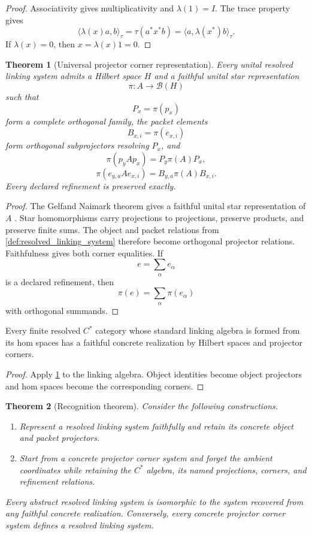 \documentclass{aomart}
\newtheorem{theorem}{Theorem}[section]
\theoremstyle{definition}
\theoremstyle{remark}
\newcommand{\B}{\mathcal B}
\newcommand{\Rcite}[1]{\cite{#1}}
\begin{document}
\begin{proof}
Associativity gives multiplicativity and \(\lambda(1)=I\). The trace property gives
\[
 \langle\lambda(x)a,b\rangle_\tau
 =
 \tau(a^*x^*b)
 =
 \langle a,\lambda(x^*)b\rangle_\tau.
\]
If \(\lambda(x)=0\), then \(x=\lambda(x)1=0\).
\end{proof}

\begin{theorem}[Universal projector corner representation]\label{thm:universal_projector_representation}
Every unital resolved linking system admits a Hilbert space \(H\) and a faithful unital star representation
\[
 \pi:A\longrightarrow\B(H)
\]
such that
\[
 P_x=\pi(p_x)
\]
form a complete orthogonal family, the packet elements
\[
 B_{x,i}=\pi(e_{x,i})
\]
form orthogonal subprojectors resolving \(P_x\), and
\[
 \pi(p_yAp_x)=P_y\pi(A)P_x,
\]
\[
 \pi(e_{y,a}Ae_{x,i})
 =
 B_{y,a}\pi(A)B_{x,i}.
\]
Every declared refinement is preserved exactly.
\end{theorem}

\begin{proof}
The Gelfand Naimark theorem gives a faithful unital star representation of \(A\) \Rcite{R1}. Star homomorphisms carry projections to projections, preserve products, and preserve finite sums. The object and packet relations from \cref{def:resolved_linking_system} therefore become orthogonal projector relations. Faithfulness gives both corner equalities. If
\[
 e=\sum_\alpha e_\alpha
\]
is a declared refinement, then
\[
 \pi(e)=\sum_\alpha\pi(e_\alpha)
\]
with orthogonal summands.
\end{proof}

\begin{corollary}\label{cor:resolved_categories}
Every finite resolved \(C^*\) category whose standard linking algebra is formed from its hom spaces has a faithful concrete realization by Hilbert spaces and projector corners.
\end{corollary}

\begin{proof}
Apply \cref{thm:universal_projector_representation} to the linking algebra. Object identities become object projectors and hom spaces become the corresponding corners.
\end{proof}

\begin{theorem}[Recognition theorem]\label{thm:recognition}
Consider the following constructions.
\begin{enumerate}
\item Represent a resolved linking system faithfully and retain its concrete object and packet projectors.
\item Start from a concrete projector corner system and forget the ambient coordinates while retaining the \(C^*\) algebra, its named projections, corners, and refinement relations.
\end{enumerate}
Every abstract resolved linking system is isomorphic to the system recovered from any faithful concrete realization. Conversely, every concrete projector corner system defines a resolved linking system.
\end{theorem}
\end{document}
